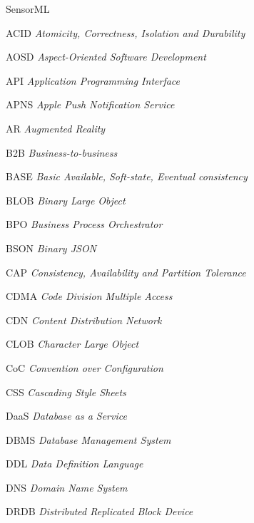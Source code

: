 \documentclass[diss]{template/setrem}
\begin{document}
\begin{singlespaced}
\listoffigures
\end{singlespaced}

\begin{singlespaced}
\listoftables
\end{singlespaced}


\begin{listofabbrv}{SensorML}%
\item[ACID] \emph{Atomicity, Correctness, Isolation and Durability}
\item[AOSD] \emph{Aspect-Oriented Software Development}
\item[API] \emph{Application Programming Interface}
\item[APNS] \emph{Apple Push Notification Service}
\item[AR] \emph{Augmented Reality}
\item[B2B] \emph{Business-to-business}
\item[BASE] \emph{Basic Available, Soft-state, Eventual consistency}
\item[BLOB] \emph{Binary Large Object}
\item[BPO] \emph{Business Process Orchestrator}
\item[BSON] \emph{Binary JSON}
\item[CAP] \emph{Consistency, Availability and Partition Tolerance}
\item[CDMA] \emph{Code Division Multiple Access}
\item[CDN] \emph{Content Distribution Network}
\item[CLOB] \emph{Character Large Object}
\item[CoC] \emph{Convention over Configuration}
\item[CSS] \emph{Cascading Style Sheets}
\item[DaaS] \emph{Database as a Service}
\item[DBMS] \emph{Database Management System}
\item[DDL] \emph{Data Definition Language}
\item[DNS] \emph{Domain Name System}
\item[DRDB] \emph{Distributed Replicated Block Device}

\end{listofabbrv}
\end{document}
